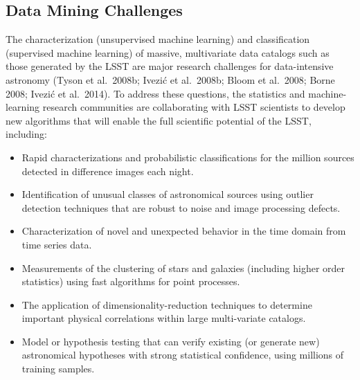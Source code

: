 \documentclass{emulateapj}
\newcommand{\B}[1]{{#1}}
\begin{document}
\B{
\subsection{Data Mining Challenges}

The characterization (unsupervised machine learning) and classification (supervised machine learning) of 
massive, multivariate data catalogs such as those generated by the LSST are major research challenges for 
data-intensive astronomy (Tyson et al.~2008b; Ivezi\'{c} et al.~2008b;
Bloom et al.~2008; Borne 2008; Ivezi\'c et al.~2014). To address these questions, the statistics and machine-learning research 
communities are collaborating with LSST scientists to develop new algorithms that will enable the full 
scientific potential of the LSST, including:
\begin{itemize}
\item Rapid characterizations and probabilistic classifications for
  the million sources
          detected in difference images each night.
\item Identification of unusual classes of astronomical sources using outlier detection techniques that are 
          robust to noise and image processing defects.
\item Characterization of novel and unexpected behavior in the time domain from time series data.
\item Measurements of the clustering of stars and galaxies (including higher order statistics) using fast 
          algorithms for point processes.
\item The application of dimensionality-reduction techniques to determine important physical correlations 
          within large multi-variate catalogs.
\item Model or hypothesis testing that can verify existing (or generate new) astronomical hypotheses with 
          strong statistical confidence, using millions of training samples.
\end{itemize}

}
\end{document}
